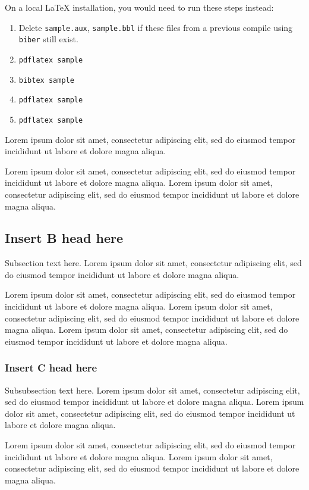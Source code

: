 \documentclass[
  journal=largetwo,
  manuscript=article-type,
  year=2020,
  volume=37,
]{cup-journal}
\begin{document}
On a local \LaTeX{} installation, you would need to run these steps instead:
  \begin{enumerate}
\item Delete \texttt{sample.aux}, \texttt{sample.bbl} if these files from a previous compile using \texttt{biber} still exist.
\item \verb|pdflatex sample|
  \item \verb|bibtex sample|
  \item \verb|pdflatex sample|
  \item \verb|pdflatex sample|
  \end{enumerate}

Lorem ipsum dolor sit amet, consectetur adipiscing elit, sed do eiusmod tempor incididunt ut labore et dolore magna aliqua. 

Lorem ipsum dolor sit amet, consectetur adipiscing elit, sed do eiusmod tempor incididunt ut labore et dolore magna aliqua. Lorem ipsum dolor sit amet, consectetur adipiscing elit, sed do eiusmod tempor incididunt ut labore et dolore magna aliqua. 


\subsection{Insert B head here}
Subsection text here. Lorem ipsum\autocite{Bayer_etal_2013} dolor sit amet, consectetur adipiscing elit, sed do eiusmod tempor incididunt ut labore\autocite{Adade_etal_2007} et dolore magna aliqua. 

Lorem ipsum dolor sit amet, consectetur adipiscing elit, sed do eiusmod tempor incididunt ut labore et dolore magna aliqua. Lorem ipsum dolor sit amet, consectetur adipiscing elit, sed do eiusmod tempor incididunt ut labore et dolore magna aliqua. Lorem ipsum dolor sit amet, consectetur adipiscing elit, sed do eiusmod tempor incididunt ut labore et dolore magna aliqua. 

\subsubsection{Insert C head here}
Subsubsection text here. Lorem ipsum dolor sit amet, consectetur adipiscing elit, sed do eiusmod tempor incididunt ut labore et dolore magna aliqua. 
Lorem ipsum dolor sit amet, consectetur adipiscing elit, sed do eiusmod tempor incididunt ut labore et dolore magna aliqua. 

Lorem ipsum dolor sit amet, consectetur adipiscing elit, sed do eiusmod tempor incididunt ut labore et dolore magna aliqua. Lorem ipsum dolor sit amet, consectetur adipiscing elit, sed do eiusmod tempor incididunt ut labore et dolore magna aliqua. 
\end{document}
